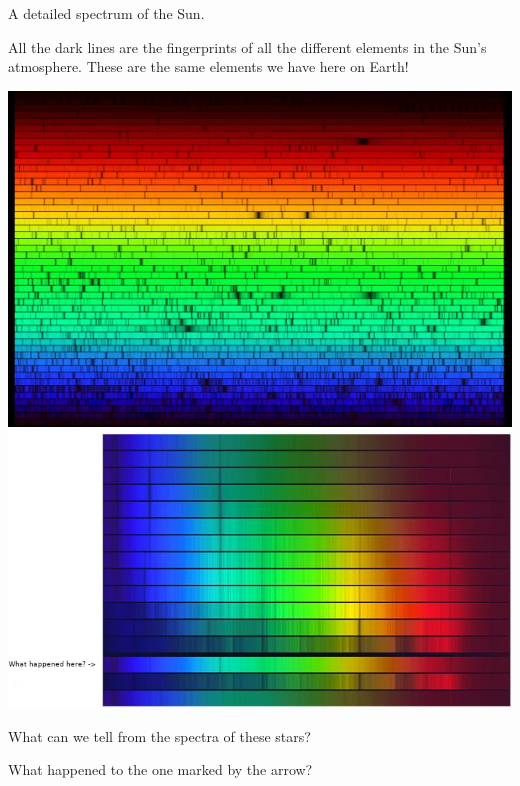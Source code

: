 \documentclass[12pt]{article}
\begin{document}
\begin{landscape}
\begin{center}
\Large
A detailed spectrum of the Sun.

All the dark lines are the fingerprints of all the different elements in the Sun's atmosphere. These are the same 
elements we have here on Earth!

\includegraphics[width=9in]{solarspectrum.jpg}
\newpage
\includegraphics[width=10in]{stellar-spectra.jpg}

\bigskip

What can we tell from the spectra of these stars?

\bigskip

What happened to the one marked by the arrow? 


\end{center}
\end{landscape}
\end{document}
